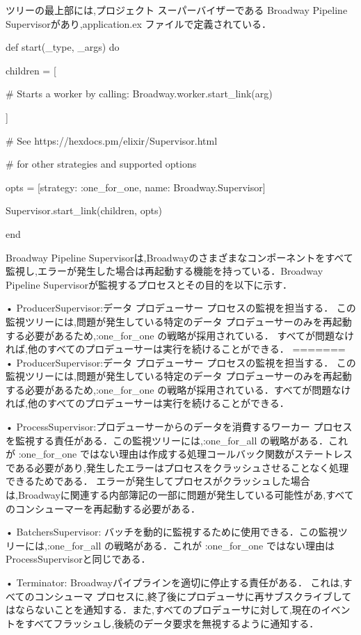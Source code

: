 \documentclass[a4paper]{jreport}	%
\begin{document}
ツリーの最上部には,プロジェクト スーパーバイザーである Broadway Pipeline Supervisorがあり,application.ex ファイルで定義されている．

def start(\_type, \_args) do 

children = [

    \# Starts a worker by calling: Broadway.worker.start\_link(arg)
    
    
]

 \# See https://hexdocs.pm/elixir/Supervisor.html

 \# for other strategies and supported options

opts = [strategy: :one\_for\_one, name: Broadway.Supervisor] 

Supervisor.start\_link(children, opts)

end

Broadway Pipeline Supervisorは,Broadwayのさまざまなコンポーネントをすべて監視し,エラーが発生した場合は再起動する機能を持っている．Broadway Pipeline Supervisorが監視するプロセスとその目的を以下に示す．


• ProducerSupervisor:データ プロデューサー プロセスの監視を担当する． この監視ツリーには,問題が発生している特定のデータ プロデューサーのみを再起動する必要があるため,:one\_for\_one の戦略が採用されている． すべてが問題なければ,他のすべてのプロデューサーは実行を続けることができる．
=======
• ProducerSupervisor:データ プロデューサー プロセスの監視を担当する． この監視ツリーには,問題が発生している特定のデータ プロデューサーのみを再起動する必要があるため,:one\_for\_one の戦略が採用されている．すべてが問題なければ,他のすべてのプロデューサーは実行を続けることができる．


• ProcessSupervisor:プロデューサーからのデータを消費するワーカー プロセスを監視する責任がある．この監視ツリーには,:one\_for\_all の戦略がある．これが :one\_for\_one ではない理由は作成する処理コールバック関数がステートレスである必要があり,発生したエラーはプロセスをクラッシュさせることなく処理できるためである． エラーが発生してプロセスがクラッシュした場合は,Broadwayに関連する内部簿記の一部に問題が発生している可能性があ,すべてのコンシューマーを再起動する必要がある．

• BatchersSupervisor: バッチを動的に監視するために使用できる．この監視ツリーには,:one\_for\_all の戦略がある．これが :one\_for\_one ではない理由はProcessSupervisorと同じである．

• Terminator: Broadwayパイプラインを適切に停止する責任がある． これは,すべてのコンシューマ プロセスに,終了後にプロデューサに再サブスクライブしてはならないことを通知する．また,すべてのプロデューサに対して,現在のイベントをすべてフラッシュし,後続のデータ要求を無視するように通知する．
\end{document}
